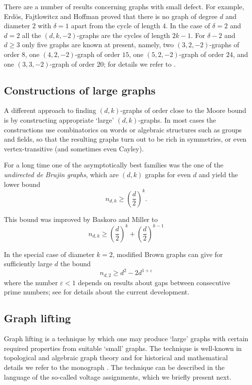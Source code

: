 \documentclass[a4paper,12pt,oneside]{report}%
\begin{document}
There are a number of results concerning graphs with small defect. For example, Erd\"os, Fajtlowitcz and Hoffman proved \cite{Erd-Faj} that there is no graph of degree $d$ and diameter $2$ with $\delta = 1$ apart from the cycle of length $4$. In the case of $\delta = 2$ and $d = 2$ all the $(d,k,-2)$-graphs are the cycles of length $2k-1$. For $\delta-2$ and $d \geq 3$ only five graphs are known at present, namely, two $(3,2,-2)$-graphs of order $8$, one $(4,2,-2)$-graph of order $15$, one $(5,2,-2)$-graph of order $24$, and one $(3,3,-2)$-graph of order $20$; for details we refer to \cite{Mil-Sir}.

\subsection{Constructions of large graphs}
A different approach to finding $(d,k)$-graphs of order close to the Moore bound is by constructing appropriate `large' $(d,k)$-graphs. In most cases the constructions use combinatorics on words or algebraic structures such as groups and fields, so that the resulting graphs turn out to be rich in symmetries, or even vertex-transitive (and sometimes even Cayley).
\medskip

For a long time one of the asymptotically best families was the one of the \textit{undirected de Brujin graphs}, which are $(d,k)$ graphs for even $d$ and yield the lower bound
\begin{equation*}
	n_{d,k} \geq \left( \frac{d}{2} \right)^{k}.
\end{equation*}

This bound was improved by Baskoro and Miller \cite{Bas-Mil} to
\begin{equation}
	n_{d,k} \geq \left( \frac{d}{2} \right)^{k} +  \left( \frac{d}{2} \right)^{k-1}
\end{equation}	

In the special case of diameter $k=2$, modified Brown graphs can give for sufficiently large $d$ the bound
\begin{equation*}
	n_{d,2} \geq d^{2} - 2d^{1+\varepsilon}
\end{equation*}	
where the number $\varepsilon < 1$ depends on results about gaps between consecutive prime numbers; see \cite{Bev-Ers} for details about the current development.

\subsection{Graph lifting}
Graph lifting is a technique by which one may produce `large' graphs with certain required properties from suitable `small' graphs. The technique is well-known in topological and algebraic graph theory and for historical and mathematical details we refer to the monograph \cite{Gro-Tuc}. The technique can be described in the language of the so-called voltage assignments, which we briefly present next.
\medskip
\end{document}
